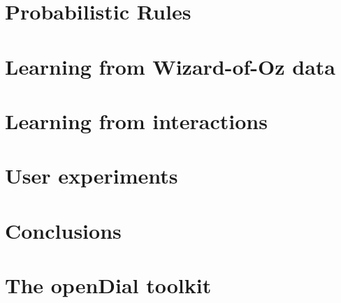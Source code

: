 \documentclass[english,12pt]{uiophd}
\begin{document}
\chapter{Probabilistic Rules}

\chapter{Learning from Wizard-of-Oz data}

\chapter{Learning from interactions}

\chapter{User experiments}

\chapter{Conclusions}

\appendix

\chapter{The openDial toolkit}

\nocite{rulebasedmodels-sigdial2012}



\printindex
\end{document}
